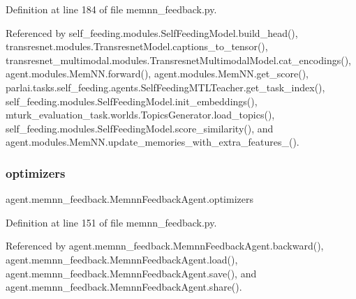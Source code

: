 Definition at line 184 of file memnn\+\_\+feedback.\+py.



Referenced by self\+\_\+feeding.\+modules.\+Self\+Feeding\+Model.\+build\+\_\+head(), transresnet.\+modules.\+Transresnet\+Model.\+captions\+\_\+to\+\_\+tensor(), transresnet\+\_\+multimodal.\+modules.\+Transresnet\+Multimodal\+Model.\+cat\+\_\+encodings(), agent.\+modules.\+Mem\+N\+N.\+forward(), agent.\+modules.\+Mem\+N\+N.\+get\+\_\+score(), parlai.\+tasks.\+self\+\_\+feeding.\+agents.\+Self\+Feeding\+M\+T\+L\+Teacher.\+get\+\_\+task\+\_\+index(), self\+\_\+feeding.\+modules.\+Self\+Feeding\+Model.\+init\+\_\+embeddings(), mturk\+\_\+evaluation\+\_\+task.\+worlds.\+Topics\+Generator.\+load\+\_\+topics(), self\+\_\+feeding.\+modules.\+Self\+Feeding\+Model.\+score\+\_\+similarity(), and agent.\+modules.\+Mem\+N\+N.\+update\+\_\+memories\+\_\+with\+\_\+extra\+\_\+features\+\_\+().

\mbox{\label{classagent_1_1memnn__feedback_1_1MemnnFeedbackAgent_a1bb9de6dda01a29501dfaaebf56877f6}} 
\subsubsection{\texorpdfstring{optimizers}{optimizers}}
{\footnotesize\ttfamily agent.\+memnn\+\_\+feedback.\+Memnn\+Feedback\+Agent.\+optimizers}



Definition at line 151 of file memnn\+\_\+feedback.\+py.



Referenced by agent.\+memnn\+\_\+feedback.\+Memnn\+Feedback\+Agent.\+backward(), agent.\+memnn\+\_\+feedback.\+Memnn\+Feedback\+Agent.\+load(), agent.\+memnn\+\_\+feedback.\+Memnn\+Feedback\+Agent.\+save(), and agent.\+memnn\+\_\+feedback.\+Memnn\+Feedback\+Agent.\+share().

\mbox{\label{classagent_1_1memnn__feedback_1_1MemnnFeedbackAgent_ac49716fcde2a899d5f3918c8bf39d7df}} 
